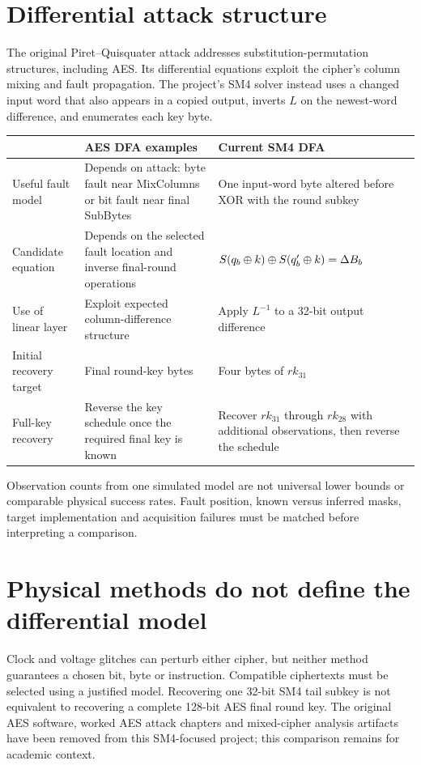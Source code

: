 \section{Differential attack structure}
The original Piret--Quisquater attack addresses substitution-permutation structures, including AES. Its differential equations exploit the cipher's column mixing and fault propagation. The project's SM4 solver instead uses a changed input word that also appears in a copied output, inverts $L$ on the newest-word difference, and enumerates each key byte.
\begin{center}\begin{tabular}{P{.26\linewidth}P{.32\linewidth}P{.32\linewidth}}\toprule
 & AES DFA examples & Current SM4 DFA\\\midrule
Useful fault model & Depends on attack: byte fault near MixColumns or bit fault near final SubBytes & One input-word byte altered before XOR with the round subkey\\
Candidate equation & Depends on the selected fault location and inverse final-round operations & $S(q_b\mathbin{\oplus} k)\mathbin{\oplus} S(q'_b\mathbin{\oplus} k)=\Delta B_b$\\
Use of linear layer & Exploit expected column-difference structure & Apply $L^{-1}$ to a 32-bit output difference\\
Initial recovery target & Final round-key bytes & Four bytes of $rk_{31}$\\
Full-key recovery & Reverse the key schedule once the required final key is known & Recover $rk_{31}$ through $rk_{28}$ with additional observations, then reverse the schedule\\\bottomrule
\end{tabular}\end{center}
Observation counts from one simulated model are not universal lower bounds or comparable physical success rates. Fault position, known versus inferred masks, target implementation and acquisition failures must be matched before interpreting a comparison.
\section{Physical methods do not define the differential model}
Clock and voltage glitches can perturb either cipher, but neither method guarantees a chosen bit, byte or instruction. Compatible ciphertexts must be selected using a justified model. Recovering one 32-bit SM4 tail subkey is not equivalent to recovering a complete 128-bit AES final round key.
The original AES software, worked AES attack chapters and mixed-cipher analysis artifacts have been removed from this SM4-focused project; this comparison remains for academic context.
